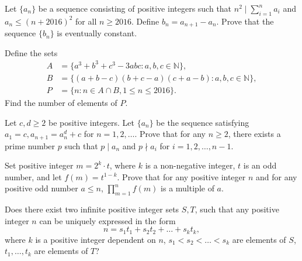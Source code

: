 \documentclass[problems.tex]{subfile}
\begin{document}
	\begin{problem}
		Let $\{ a_n\}$ be a sequence consisting of positive integers such that $n^2 \mid \sum_{i=1}^{n}{a_i}$ and $a_n\leq (n+2016)^2$ for all $n\geq 2016$.
		Define $b_n=a_{n+1}-a_n$. Prove that the sequence $\{ b_n\}$ is eventually constant. %
	\end{problem}

	\begin{problem}
		Define the sets
		\begin{align*}
			A &=\{a^3+b^3+c^3-3abc:a,b,c\in\mathbb{N}\}, \\
			B &=\{(a+b-c)(b+c-a)(c+a-b):a,b,c\in\mathbb{N}\},\\
			P &=\{n:n\in A\cap B,1\le n\le 2016\}.
		\end{align*}
		Find the number of elements of $P$. %
	\end{problem}

	\begin{problem}
		Let $c,d \geq 2$ be positive integers. Let $\{a_n\}$ be the sequence satisfying $a_1 = c, a_{n+1} = a_n^d + c$ for $n = 1,2,\dots$.
		Prove that for any $n \geq 2$, there exists a prime number $p$ such that $p\mid a_n$ and $p \nmid a_i$ for $i = 1,2,\dots, n-1$. %
	\end{problem}

	\begin{problem}
		Set positive integer $m=2^k\cdot t$, where $k$ is a non-negative integer, $t$ is an odd number, and let $f(m)=t^{1-k}$. Prove that for any positive integer $n$ and for any positive odd number $a\le n$, $\prod_{m=1}^n f(m)$ is a multiple of $a$. %
	\end{problem}

	\begin{problem}
		Does there exist two infinite positive integer sets $S,T$, such that any positive integer $n$ can be uniquely expressed in the form
		$$n=s_1t_1+s_2t_2+\dots+s_kt_k,$$where $k$ is a positive integer dependent on $n$, $s_1<s_2<\dots<s_k$ are elements of $S$, $t_1,\dots, t_k$ are elements of $T$? %
	\end{problem}
\end{document}
